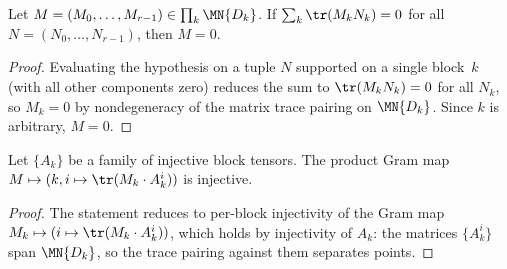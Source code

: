 \begin{lemma}%
    \label{lem:piTrace_mul_right_eq_zero}
    \leanok
    Let $M = (M_0, \ldots, M_{r-1}) \in \prod_{k} \MN{D_k}$.
    If $\sum_{k} \tr(M_k N_k) = 0$ for all
    $N = (N_0, \ldots, N_{r-1})$, then $M = 0$.
\end{lemma}

\begin{proof}\leanok
    Evaluating the hypothesis on a tuple $N$ supported on a single block~$k$ (with all other components
    zero)
    reduces the sum to $\tr(M_k N_k) = 0$ for all $N_k$, so
    $M_k = 0$ by nondegeneracy of the matrix trace pairing on
    $\MN{D_k}$.
    Since $k$ is arbitrary, $M = 0$.
\end{proof}

\begin{lemma}%
    \label{lem:piTraceMulRightPi_ker_eq_bot}
    \leanok
    Let $\{A_k\}$ be a family of injective block tensors.
    The product Gram map
    $M \mapsto (k, i \mapsto \tr(M_k \cdot A_k^i))$
    is injective.
\end{lemma}

\begin{proof}\leanok{}
    The statement reduces to per-block injectivity of the Gram map
    $M_k \mapsto (i \mapsto \tr(M_k \cdot A_k^i))$, which holds by
    injectivity of $A_k$: the matrices $\{A_k^i\}$ span $\MN{D_k}$,
    so the trace pairing against them separates points.
\end{proof}

